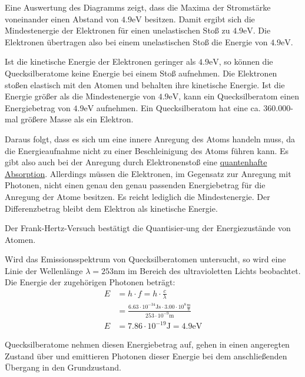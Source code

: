 \documentclass{tuftebook}
\begin{document}
        Eine Auswertung des Diagramms zeigt, dass die Maxima der Stromstärke voneinander einen Abstand von $4.9\mathrm{eV}$ besitzen. Damit ergibt sich die Mindestenergie der Elektronen für einen unelastischen Stoß zu $4.9\mathrm{eV}$. Die Elektronen übertragen also bei einem unelastischen Stoß die Energie von $4.9\mathrm{eV}$.
        \begin{beobachtung}
            \vspace{-1em}
            Ist die kinetische Energie der Elektronen geringer als $4.9\mathrm{eV}$, so können die Quecksilberatome keine Energie bei einem Stoß aufnehmen. Die Elektronen stoßen elastisch mit den Atomen und behalten ihre kinetische Energie. Ist die Energie größer als die Mindestenergie von $4.9\mathrm{eV}$, kann ein Quecksilberatom einen Energiebetrag von $4.9\mathrm{eV}$ aufnehmen. Ein Quecksilberatom hat eine ca. $360.000$-mal größere Masse als ein Elektron.
        \end{beobachtung}
        Daraus folgt, dass es sich um eine innere Anregung des Atoms handeln muss, da die Energieaufnahme nicht zu einer Beschleinigung des Atoms führen kann. Es gibt also auch bei der Anregung durch Elektronenstoß eine \hyperref[def:quantenhafteabsorption]{quantenhafte Absorption}. Allerdings müssen die Elektronen, im Gegensatz zur Anregung mit Photonen, nicht einen genau den genau passenden Energiebetrag für die Anregung der Atome besitzen. Es reicht lediglich die Mindestenergie. Der Differenzbetrag bleibt dem Elektron als kinetische Energie.
        \begin{schlussfolgerung}
            \vspace{-1em}
            Der Frank-Hertz-Versuch bestätigt die Quantisier-ung der Energiezustände von Atomen. 

            Wird das Emissionsspektrum von Quecksilberatomen untersucht, so wird eine Linie der Wellenlänge $\lambda=253\mathrm{nm}$ im Bereich des ultravioletten Lichts beobachtet. Die Energie der zugehörigen Photonen beträgt:
            \begin{align*}
                E&=h\cdot f=h\cdot\frac{c}{\lambda}\\
                &=\frac{6.63\cdot10^{-34}\mathrm{Js}\cdot3.00\cdot10^8\frac{\mathrm{m}}{\mathrm{s}}}{253\cdot10^{-9}\mathrm{m}}\\
                E&=7.86\cdot10^{-19}\mathrm{J}=4.9\mathrm{eV}
            \end{align*}
        \end{schlussfolgerung}
        Quecksilberatome nehmen diesen Energiebetrag auf, gehen in einen angeregten Zustand über und emittieren Photonen dieser Energie bei dem anschließenden Übergang in den Grundzustand.
\end{document}
